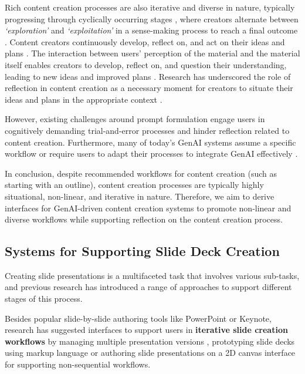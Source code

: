 Rich content creation processes are also iterative and diverse in nature, typically progressing through cyclically occurring stages \cite{baker_ideas_2010, dorta_signs_2010}, where creators alternate between \textit{‘exploration’} and \textit{‘exploitation’} in a sense-making process to reach a final outcome \cite{pirolli_sensemaking_2005}.
Content creators continuously develop, reflect on, and act on their ideas and plans \cite{kolko_sensemaking_2010, schon_reflective_1983}. 
The interaction between users' perception of the material and the material itself enables creators to develop, reflect on, and question their understanding, leading to new ideas and improved plans \cite{klein_making_2006}. 
Research has underscored the role of reflection in content creation as a necessary moment for creators to situate their ideas and plans in the appropriate context \cite{dove_argument_2016,mols_informing_2016,sharmin_reflect_2011a}.

However, existing challenges around prompt formulation engage users in cognitively demanding trial-and-error processes and hinder reflection related to content creation. 
Furthermore, many of today’s GenAI systems assume a specific workflow or require users to adapt their processes to integrate GenAI effectively \cite{tankelevitch_metacognitive_2023, sarkar_exploring_2023}. 

In conclusion, despite recommended workflows for content creation (such as starting with an outline), content creation processes are typically highly situational, non-linear, and iterative in nature. Therefore, we aim to derive interfaces for GenAI-driven content creation systems to promote non-linear and diverse workflows while supporting reflection on the content creation process.  

\subsection{Systems for Supporting Slide Deck Creation}

Creating slide presentations is a multifaceted task that involves various sub-tasks, and previous research has introduced a range of approaches to support different stages of this process.

 Besides popular slide-by-slide authoring tools like PowerPoint or Keynote, research has suggested interfaces to support users in \textbf{iterative slide creation workflows} by managing multiple presentation versions \cite{drucker_comparing_2006}, prototyping slide decks using markup language \cite{edge_hyperslides_2013} or authoring slide presentations on a 2D canvas interface \cite{lichtschlag_fly_2009} for supporting non-sequential workflows.

